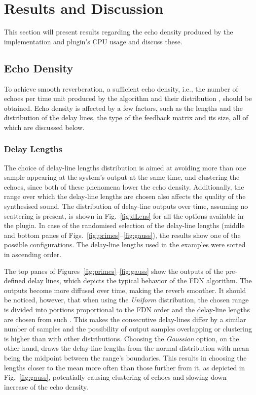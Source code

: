 \documentclass[twoside,a4paper]{article}
\begin{document}
\section{Results and Discussion}\label{sec:resDisc}

This section will present results regarding the echo density produced by the implementation and plugin's CPU usage and discuss these.

\subsection{Echo Density}
To achieve smooth reverberation, a sufficient echo density, i.e., the number of echoes per time unit produced by the algorithm and their distribution \cite{schlecht:2016:echo}, should be obtained. Echo density is affected by a few factors, such as the lengths and the distribution of the delay lines, the type of the feedback matrix and its size, all of which are discussed below.

\subsubsection{Delay Lengths} 
The choice of delay-line lengths distribution is aimed at avoiding more than one sample appearing at the system's output at the same time, and clustering the echoes, since both of these phenomena lower the echo density. Additionally, the range over which the delay-line lengths are chosen also affects the quality of the synthesised sound. The distribution of delay-line outputs over time, assuming no scattering is present, is shown in Fig.~\ref{fig:dLens} for all the options available in the plugin. In case of the randomised selection of the delay-line lengths (middle and bottom panes of Figs.~\ref{fig:primes}--\ref{fig:gauss}), the results show one of the possible configurations. The delay-line lengths used in the examples were sorted in ascending order.


The top panes of Figures~\ref{fig:primes}--\ref{fig:gauss} show the outputs of the pre-defined delay lines, which depicts the typical behavior of the FDN algorithm. The outputs become more diffused over time, making the reverb smoother. It should be noticed, however, that when using the \textit{Uniform} distribution, the chosen range is divided into portions proportional to the FDN order and the delay-line lengths are chosen from such . This makes the consecutive delay-lines differ by a similar number of samples and the possibility of output samples overlapping or clustering is higher than with other distributions. Choosing the \textit{Gaussian} option, on the other hand, draws the delay-line lengths from the normal distribution with mean being the midpoint between the range's boundaries. This results in choosing the lengths closer to the mean more often than those further from it, as depicted in Fig.~\ref{fig:gauss}, potentially causing clustering of echoes and slowing down increase of the echo density. 
\end{document}
